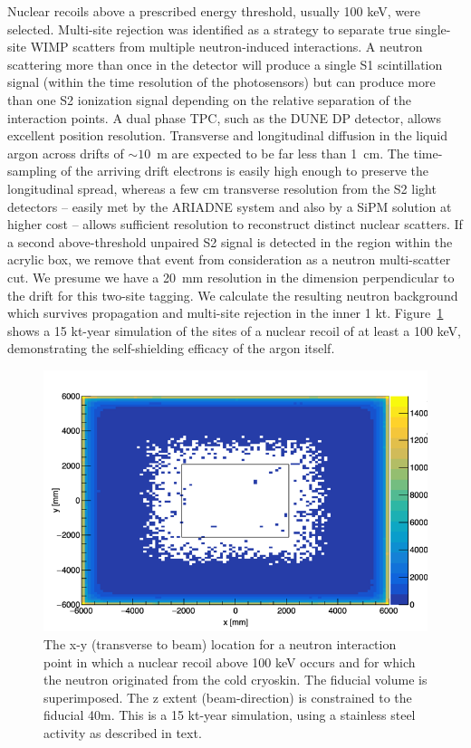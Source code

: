 \documentclass[a4paper,11pt]{article}
\begin{document}
Nuclear recoils above a prescribed energy threshold, usually 100 keV, were selected. Multi-site rejection was identified as a strategy to separate true single-site WIMP scatters from multiple neutron-induced interactions. A neutron scattering more than once in the detector will produce a single S1 scintillation signal (within the time resolution of the photosensors) but can produce more than one S2 ionization signal depending on the relative separation of the interaction points. A dual phase TPC, such as the DUNE DP detector, allows excellent position resolution. Transverse and longitudinal diffusion in the liquid argon across drifts of $\sim10$~m are expected to be far less than 1~cm. The time-sampling of the arriving drift electrons is easily high enough to preserve the longitudinal spread, whereas a few cm transverse resolution from the S2 light detectors -- easily met by the ARIADNE system and also by a SiPM solution at higher cost -- allows sufficient resolution to reconstruct distinct nuclear scatters. If a second above-threshold unpaired S2 signal is detected in the region within the acrylic box, we remove that event from consideration as a neutron multi-scatter cut. We presume we have a 20~mm resolution in the dimension perpendicular to the drift for this two-site tagging. We calculate the resulting neutron background which survives propagation and multi-site rejection in the inner 1 kt. Figure~\ref{fig:neutrons_xy} shows a 15 kt-year simulation of the sites of a nuclear recoil of at least a 100 keV, demonstrating the self-shielding efficacy of the argon itself.

\begin{figure}[ht]
\begin{centering}
\includegraphics[width=0.90\columnwidth]{Figures/neutrons_xy.png}
\end{centering}

\caption{The x-y (transverse to beam) location for a neutron interaction point in which a nuclear recoil above 100 keV occurs and for which the neutron originated from the cold cryoskin. The fiducial volume is superimposed. The z extent (beam-direction) is constrained to the fiducial 40m. This is a 15 kt-year simulation, using a stainless steel activity as described in text. }
\label{fig:neutrons_xy}
\end{figure}
\end{document}
